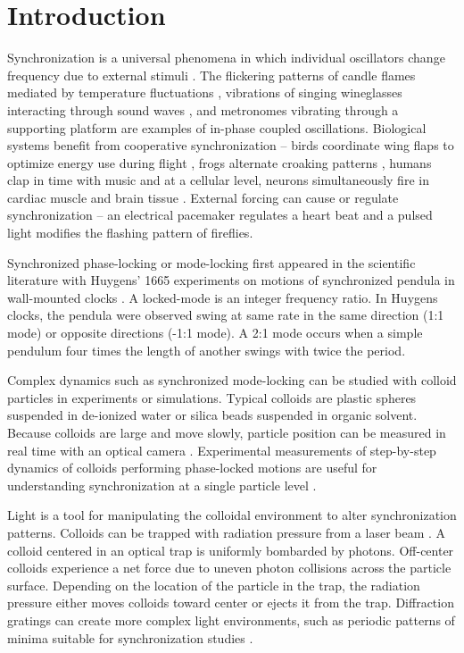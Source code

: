 \documentclass[twocolumn,showpacs,preprintnumbers,amsmath,amssymb,aps,prb]{revtex4}
\begin{document}
\section{Introduction} 
Synchronization is a universal phenomena
in which
individual oscillators change frequency due
to external stimuli \cite{Pikovsky2003}.
The
flickering patterns of
candle flames mediated by temperature fluctuations \cite{Okamoto2016},
vibrations of singing wineglasses interacting 
through sound waves \cite{Arane2009}, 
and metronomes vibrating through a supporting platform \cite{Jia2015}
are examples of in-phase coupled oscillations. 
Biological systems benefit from cooperative
synchronization --
birds coordinate wing flaps
to optimize energy use during flight \cite{Portugal2014},
frogs alternate croaking patterns \cite{Aihara2014},
humans clap in time with music \cite{Tranchant2016}
and 
at a cellular level, 
neurons simultaneously fire in cardiac muscle \cite{MartinHall1999}
and brain tissue \cite{Singer1999}.
External forcing can cause or regulate 
synchronization -- 
an electrical pacemaker 
regulates a heart beat 
and 
a pulsed light modifies the
flashing pattern of fireflies. 

Synchronized phase-locking or mode-locking 
first appeared in the scientific literature
with 
Huygens' 1665 experiments on
motions of synchronized 
pendula in wall-mounted clocks \cite{Bennett2002}.
A locked-mode is an integer frequency ratio.
In Huygens clocks,
the pendula were observed swing at same rate
in the same direction (1:1 mode) or
opposite directions (-1:1 mode).
A 2:1 mode occurs when a simple pendulum four
times the length of another swings with twice the period.

Complex dynamics such as synchronized mode-locking
can be studied with
colloid particles in experiments or simulations.
Typical colloids are   
plastic spheres suspended in
de-ionized water or silica beads suspended in organic solvent.
Because 
colloids are large 
and move slowly, 
particle position 
can be measured in real time 
with an optical camera \cite{Pertsinidis2001}. 
Experimental measurements of 
step-by-step dynamics of 
colloids performing phase-locked motions
are useful for
understanding synchronization at a single particle level \cite{Juniper2015,Juniper2017}. 

Light is a
tool for manipulating the colloidal environment
to alter synchronization patterns.
Colloids can be trapped
with 
radiation pressure from 
a laser beam \cite{Ashkin1997}.
A colloid centered in an optical trap is 
uniformly bombarded by photons. 
Off-center colloids 
experience a net force
due to uneven photon collisions across
the particle surface.
Depending on the 
location of the particle in the trap,
the radiation pressure either moves colloids toward center 
or ejects it from the trap.
Diffraction gratings can create
more complex light environments, 
such as periodic patterns of minima
suitable for synchronization studies \cite{Grier2003}.
\end{document}
